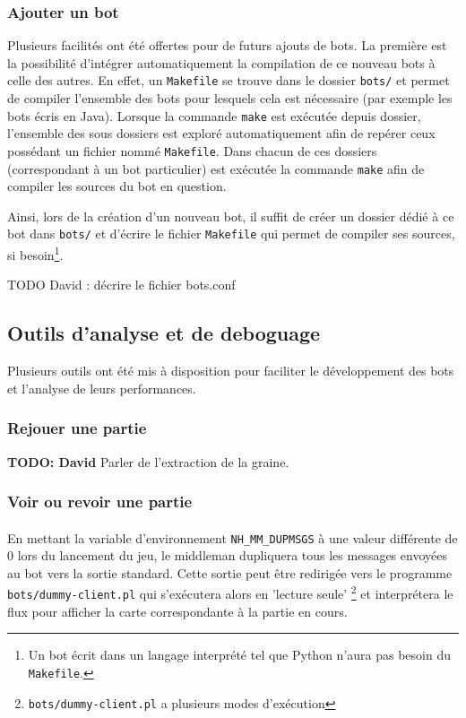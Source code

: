 \documentclass[a4paper,12pt]{article}
\begin{document}
\subsubsection{Ajouter un bot}

Plusieurs facilités ont été offertes pour de futurs ajouts de bots. La
première est la possibilité d'intégrer automatiquement la compilation de ce
nouveau bots à celle des autres. En effet, un \verb!Makefile! se trouve dans le
dossier \verb!bots/! et permet de compiler l'ensemble des bots pour lesquels
cela est nécessaire (par exemple les bots écris en Java). Lorsque la
commande \verb!make! est exécutée depuis dossier, l'ensemble des sous dossiers
est exploré automatiquement afin de repérer ceux possédant un fichier nommé
\verb!Makefile!. Dans chacun de ces dossiers (correspondant à un bot
particulier) est exécutée la commande \verb!make! afin de compiler les sources
du bot en question.

Ainsi, lors de la création d'un nouveau bot, il suffit de créer un dossier
dédié à ce bot dans \verb!bots/! et d'écrire le fichier \verb!Makefile! qui
permet de compiler ses sources, si besoin\footnote{Un bot écrit dans un
langage interprété tel que Python n'aura pas besoin du \verb!Makefile!.}.

TODO David : décrire le fichier bots.conf

\subsection{Outils d'analyse et de deboguage}

Plusieurs outils ont été mis à disposition pour faciliter le développement des
bots et l'analyse de leurs performances.

\subsubsection{Rejouer une partie}

\textbf{TODO: David} Parler de l'extraction de la graine.

\subsubsection{Voir ou revoir une partie}

\paragraph{}
En mettant la variable d'environnement \verb!NH_MM_DUPMSGS! à une valeur
différente de 0 lors du lancement du jeu, le middleman dupliquera tous les
messages envoyées au bot vers la sortie standard. Cette sortie peut être
redirigée vers le programme \verb!bots/dummy-client.pl! qui s'exécutera alors en
'lecture seule' \footnote{\verb!bots/dummy-client.pl! a plusieurs modes
d'exécution} et interprétera le flux pour afficher la carte correspondante à
la partie en cours.
\end{document}

